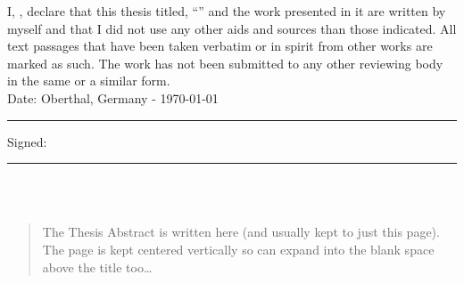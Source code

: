 \documentclass[
11pt, %
english, %
singlespacing, %
headsepline, %
]{MastersDoctoralThesis} %
\begin{document}

\begin{declaration}
\addchaptertocentry{\authorshipname} %
\noindent I, \authorname, declare that this thesis titled, \enquote{\ttitle} and the work presented in it are written 
by myself and that I did not use any other aids and sources than those indicated. All text passages that have been 
taken verbatim or in spirit from other works are marked as such. The work has not been submitted to any other reviewing 
body in the same or a similar form.
\\

\noindent Date: Oberthal, Germany - \today\\
\rule[0.5em]{25em}{0.5pt} %

\noindent Signed:\\
\rule[0.5em]{25em}{0.5pt}\\
\noindent {\authorname}\\

\end{declaration}

\cleardoublepage


\begin{abstract}
\addchaptertocentry{\abstractname}
The Thesis Abstract is written here (and usually kept to just this page). The page is kept centered vertically so can expand into the blank space above the title too\ldots
\end{abstract}


\tableofcontents %

\listoffigures %

\listoftables %

\end{document}
